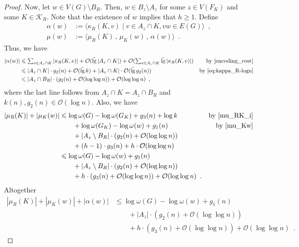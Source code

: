 \documentclass{patmorin}
\let\eqref\cref
\renewcommand{\le}{\leqslant}
\renewcommand{\geq}{\geqslant}
\renewcommand{\leq}{\leqslant}
\DeclareMathOperator{\lgg}{\hat{lg}}
\newcommand{\Oh}{\calO}
\newcommand{\calK}{\mathcal{K}}
\newcommand{\calO}{\mathcal{O}}
\begin{document}
\begin{proof}
    Now, let $w\in V(G)\setminus B_R$.
    Then, $w\in B_z\setminus A_z$ for some $z\in V(F_K)$ and some $K\in\calK_R$.
    Note that the existence of $w$ implies that $h\geq 1$.
    Define
    \begin{align*}
        \alpha(w)&:=\langle\kappa_R(K,v)\mid v\in A_z\cap K, vw\in E(G)\rangle\enspace,\\
        \mu(w) &:= \langle\mu_R(K)\,,\, \mu_K(w)\,,\, \alpha(w) \rangle \enspace .
    \end{align*}
    Thus,  we have
    \begin{align*}
        |\alpha(w)|
        &\leq \textstyle\sum_{v\in A_z\cap K} |\kappa_R(K,v)| +
        \Oh(\lgg|A_z\cap K|) + \Oh(\sum_{v\in A_z\cap K} \lgg |\kappa_R(K,v)|)
        &\textrm{by~\eqref{encoding_cost}}\\
        &\leq |A_z\cap K|\cdot g_2(n) +
        \Oh(\lgg k) + |A_z\cap K|\cdot\Oh(\lgg g_2(n))
        &\textrm{by~\eqref{eq:kappa_R-logn}}\\
        &\leq |A_z\cap B_R|\cdot (g_2(n) +\Oh(\log\log n)) + \Oh(\log\log n)\enspace,
    \end{align*}
    where the last line follows
    from $A_z\cap K= A_z\cap B_R$ and $k(n),g_2(n)\in\Oh(\log n)$.
    Also, we have
    \begin{align*}
       |\mu_R(K)|+|\mu_K(w)|
       & \le \log \omega(G) - \log\omega(G_K) + g_3(n) + \log k & \text{by~\eqref{mu_RK_i}}\\
       & \qquad {} + \log\omega(G_K) - \log\omega(w) + g_1(n) & \text{by~\eqref{mu_Kw}}\\
       & \qquad {} + |A_z\setminus B_R|\cdot (g_2(n) + \Oh(\log\log n))\\
       & \qquad {} + (h-1)\cdot g_3(n) + h\cdot\Oh(\log\log n)\\
       & \leq \log\omega(G) - \log\omega(w) + g_1(n)\\
       & \qquad {} + |A_z\setminus B_R|\cdot (g_2(n) + \Oh(\log\log n))\\
       & \qquad {} + h\cdot (g_3(n) + \Oh(\log\log n)) + \Oh(\log\log n) \enspace . \notag
    \end{align*}
    Altogether
    \begin{align*}
      |\mu_R(K)|+|\mu_K(w)|+|\alpha(w)|
        & \le \log \omega(G) - \log\omega(w) + g_1(n)\\
        & \qquad {} + |A_z|\cdot (g_2(n)+\Oh(\log\log n))\\
        & \qquad {} + h\cdot (g_3(n) + \Oh(\log\log n)) + \Oh(\log\log n)\enspace.

\end{align*}
\end{proof}
\end{document}
